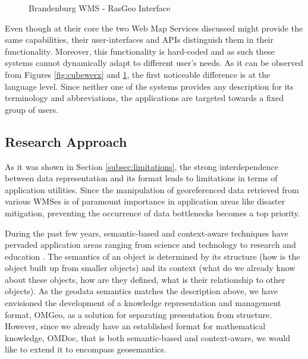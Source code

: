 \documentclass[a4paper,11pt,openany,notitlepage]{article}
\begin{document}
\begin{figure}[h]
		\centering
			\caption{Brandenburg WMS - RasGeo Interface}
		\label{fig:brandenburg}
\end{figure}

Even though at their core the two Web Map Services discussed might provide the same capabilities, their user-interfaces and APIs distinguish them in their functionality. Moreover, this functionality is hard-coded and as such these systems cannot dynamically adapt to different user's needs. As it can be observed from Figures \ref{fig:cubewerx} and \ref{fig:brandenburg}, the first noticeable difference is at the language level. Since neither one of the systems provides any description for its terminology and abbreviations, the applications are targeted towards a fixed group of users.

\subsection{Research Approach} \label{subsec:approach}
\indent

As it was shown in Section \ref{subsec:limitations}, the strong interdependence between data representation and its format leads to limitations in terms of application utilities. Since the manipulation of georeferenced data retrieved from various WMSes is of paramount importance in application areas like disaster mitigation, preventing the occurrence of data bottlenecks becomes a top priority.

During the past few years, semantic-based and context-aware techniques have pervaded application areas ranging from science and technology to research and education \cite{mkm2005}. The semantics of an object is determined by its structure (how is the object built up from smaller objects) and its context (what do we already know about these objects, how are they defined, what is their relationship to other objects). As the geodata semantics matches the description above, we have envisioned the development of a knowledge representation and management format, OMGeo, as a solution for separating presentation from structure. However, since we already have an established format for mathematical knowledge, OMDoc, that is both semantic-based and context-aware, we would like to extend it to encompass geosemantics. 
\end{document}
